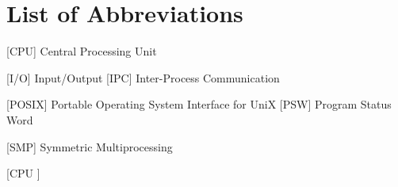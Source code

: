 
\chapter*{List of Abbreviations}

\begin{acronym} [CPU ]


 [CPU] {Central Processing Unit}






 [I/O] {Input/Output}
[IPC] {Inter-Process Communication}







 [POSIX] {Portable Operating System Interface for UniX}
 [PSW] {Program Status Word}



 [SMP] {Symmetric Multiprocessing}








\end{acronym} [CPU ]
